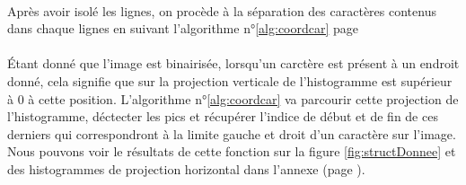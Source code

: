 \documentclass[a4paper]{article}
\begin{document}
			\paragraph{} Après avoir isolé les lignes, on procède à la séparation des caractères contenus dans chaque lignes en suivant l'algorithme n°\ref{alg:coordcar} page \pageref{alg:coordcar}
			\paragraph{} Étant donné que l'image est binairisée, lorsqu'un carctère est présent à un endroit donné, cela signifie que sur la projection verticale de l'histogramme est supérieur à 0 à cette position. L'algorithme n°\ref{alg:coordcar} va parcourir cette projection de l'histogramme, déctecter les pics et récupérer l'indice de début et de fin de ces derniers qui correspondront à la limite gauche et droit d'un caractère sur l'image. Nous pouvons voir le résultats de cette fonction sur la figure \ref{fig:structDonnee} et des histogrammes de projection horizontal dans l'annexe (page \pageref{fig:histoX1}).
\end{document}
